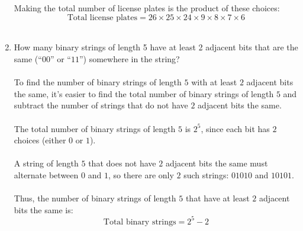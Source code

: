\documentclass{amsart}
\theoremstyle{definition}
\theoremstyle{Exercise}
\theoremstyle{remark}
\theoremstyle{rule}
\numberwithin{equation}{section}
\begin{document}
\begin{enumerate}[label=(\alph*)]
\\\\
Making the total number of license plates is the product of these choices:
\[
\text{Total license plates} = 26 \times 25 \times 24 \times 9 \times 8 \times 7 \times 6
\]
\\
    \item How many binary strings of length 5 have at least 2 adjacent bits that are the same (``$00$'' or ``$11$'') somewhere in the string?
\\\\
To find the number of binary strings of length \(5\) with at least \(2\) adjacent bits the same, it's easier to find the total number of binary strings of length \(5\) and subtract the number of strings that do not have \(2\) adjacent bits the same.\\\\
The total number of binary strings of length \(5\) is \(2^5\), since each bit has \(2\) choices (either \(0\) or \(1\)).\\\\
A string of length \(5\) that does not have \(2\) adjacent bits the same must alternate between \(0\) and \(1\), so there are only \(2\) such strings: \(01010\) and \(10101\).\\\\
Thus, the number of binary strings of length \(5\) that have at least \(2\) adjacent bits the same is: 
\[
\text{Total binary strings} = 2^5 - 2
\]
\\
  \end{enumerate}
\newpage
  \section*{}
  \section*{}
\end{document}
